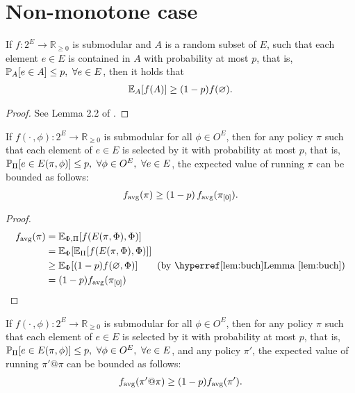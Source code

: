 \section{Non-monotone case}
\begin{lemma}\label{lem:buch}
  If $f : 2^E \to \mathbb{R}_{\geq 0}$ is submodular and $A$ is a random subset of $E$, such that each element $e \in E$ is contained in $A$ with probability at most $p$, that is, $\P[A]{e \in A} \leq p,\ \forall e \in E$, then it holds that
  \begin{align*}
    \E[A]{f(A)} \geq (1-p)f(\varnothing).
  \end{align*}
\end{lemma}
\begin{proof}
  See Lemma 2.2 of \citet{buchbinder14}.
\end{proof}

\begin{lemma}
  If $f(\cdot\,, \phi) : 2^E \to \mathbb{R}_{\geq 0}$ is submodular for all $\phi \in O^E$, then for any policy $\pi$ such that each element of $e \in E$ is selected by it with probability at most $p$, that is, $\P[\Pi]{e \in E(\pi, \phi)} \leq p,\ \forall \phi \in O^E,\ \forall e \in E$, the expected value of running $\pi$ can be bounded as follows:
\begin{align*}
  f_{\mathrm{avg}}(\pi) \geq (1-p)\,f_{\mathrm{avg}}(\pi_{[0]}).
\end{align*}
\end{lemma}
\begin{proof}
  \begin{align*}
    \favg(\pi) &= \E[\Phi,\Pi]{f(E(\pi, \Phi), \Phi)}\\
               &= \E[\Phi]{\E[\Pi]{f(E(\pi, \Phi), \Phi)}}\\
               &\geq \E[\Phi]{(1-p)f(\varnothing, \Phi)} \tag*{(by \lemmaref{lem:buch})}\\
               &= (1-p)\favg(\pio)
  \end{align*}
\end{proof}

\begin{cor}
  If $f(\cdot\,, \phi) : 2^E \to \mathbb{R}_{\geq 0}$ is submodular for all $\phi \in O^E$, then for any policy $\pi$ such that each element of $e \in E$ is selected by it with probability at most $p$, that is, $\P[\Pi]{e \in E(\pi, \phi)} \leq p,\ \forall \phi \in O^E,\ \forall e \in E$, and any policy $\pi'$, the expected value of running $\pi'@\pi$ can be bounded as follows:
\begin{align*}
  f_{\mathrm{avg}}(\pi' @ \pi) \geq (1-p)f_{\mathrm{avg}}(\pi').
\end{align*}
\end{cor}

